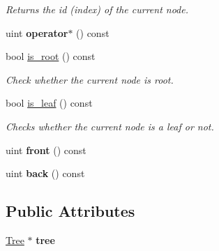 \begin{DoxyCompactItemize}
\begin{DoxyCompactList}\small\item\em Returns the id (index) of the current node. \end{DoxyCompactList}\item 
uint {\bfseries operator$\ast$} () const \hypertarget{classTreeIterator_a94819be0c93c76f72cf34b584d7add79}{}\label{classTreeIterator_a94819be0c93c76f72cf34b584d7add79}

\item 
bool \hyperlink{classTreeIterator_a641055ff6b66b09cc6b4826e3b826b28}{is\+\_\+root} () const \hypertarget{classTreeIterator_a641055ff6b66b09cc6b4826e3b826b28}{}\label{classTreeIterator_a641055ff6b66b09cc6b4826e3b826b28}

\begin{DoxyCompactList}\small\item\em Check whether the current node is root. \end{DoxyCompactList}\item 
bool \hyperlink{classTreeIterator_a42538b1bf741b30d6bda489f1944d033}{is\+\_\+leaf} () const \hypertarget{classTreeIterator_a42538b1bf741b30d6bda489f1944d033}{}\label{classTreeIterator_a42538b1bf741b30d6bda489f1944d033}

\begin{DoxyCompactList}\small\item\em Checks whether the current node is a leaf or not. \end{DoxyCompactList}\item 
uint {\bfseries front} () const \hypertarget{classTreeIterator_ae2db13b649fed318efb85eb84209c9d1}{}\label{classTreeIterator_ae2db13b649fed318efb85eb84209c9d1}

\item 
uint {\bfseries back} () const \hypertarget{classTreeIterator_a6916561fe4515aa88b4af8344b16c1fd}{}\label{classTreeIterator_a6916561fe4515aa88b4af8344b16c1fd}

\end{DoxyCompactItemize}
\subsection*{Public Attributes}
\begin{DoxyCompactItemize}
\item 
\hyperlink{classTree}{Tree} $\ast$ {\bfseries tree}\hypertarget{classTreeIterator_adb38d3ef0bf6f6cb75ea183b146946ed}{}\label{classTreeIterator_adb38d3ef0bf6f6cb75ea183b146946ed}

\end{DoxyCompactItemize}
